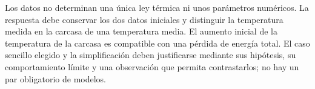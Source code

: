 Los datos no determinan una única ley térmica ni unos parámetros numéricos. La respuesta debe conservar los dos datos iniciales y distinguir la temperatura medida en la carcasa de una temperatura media. El aumento inicial de la temperatura de la carcasa es compatible con una pérdida de energía total. El caso sencillo elegido y la simplificación deben justificarse mediante sus hipótesis, su comportamiento límite y una observación que permita contrastarlos; no hay un par obligatorio de modelos.
